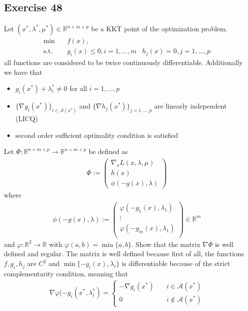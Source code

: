 \subsection{Exercise 48}
Let $(x^{*}, \lambda^{*}, \mu^{*}) \in \mathbb{R}^{n + m + p}$ be a
KKT point of the optimization problem.
\begin{align}
    \text{min}\quad &f(x),\\
    \text{s.t.}\quad & g_i(x) \le 0, i=1,\ldots,m \nonumber
                     &h_j(x) =0, j=1,\ldots,p \nonumber
\end{align}
all functions are considered to be twice continuously differentiable.
Additionally we have that
\begin{itemize}
    \item $g_i(x^{*}) + \lambda^{*}_i \neq 0$ for all $i=1,\ldots,p$
    \item $\{\nabla g_i(x^{*})\}_{i\in \mathcal{A}(x^{*})}$ and $\{\nabla
        h_j(x^{*})\}_{j=1,\ldots,p}$ are linearly independent (LICQ)
    \item second order sufficient optimality condition is satisfied
\end{itemize}
Let $\Phi: \mathbb{R}^{n+m+p}\to \mathbb{R}^{n+m+p}$ be defined as
\begin{align}
   \Phi  :=
   \begin{pmatrix}
       \nabla_x L(x,\lambda ,\mu)\\
       h(x)\\
       \phi(-g(x), \lambda)
   \end{pmatrix}
\end{align}
where
\begin{align}
    \phi(-g(x), \lambda) :=
    \begin{pmatrix}
        \varphi(-g_1(x), \lambda_1)\\
        \vdots\\
        \varphi(-g_m(x), \lambda_1)\\
    \end{pmatrix} \in \mathbb{R}^{m}
\end{align}
and $\varphi:\mathbb{R}^{2} \to \mathbb{R}$ with $\varphi(a,b) = \min \{a,
b\}$. Show that the matrix $\nabla \Phi$ is well defined and regular.
\newline
The matrix is well defined because first of all, the functions $f, g_i, h_j$
are $C^{2}$ and $\min \{-g_i(x), \lambda_i\}$ is differentiable because of
the strict complementarity condition, meaning that
\begin{align}
    \nabla \varphi(-g_i(x^{*}, \lambda^{*}_i) =
    \begin{cases}
        -\nabla g_i(x^{*}) \quad & i \in \mathcal{A}(x^{*})\\
        0 \quad & i \not\in \mathcal{A}(x^{*})
    \end{cases}
\end{align}
